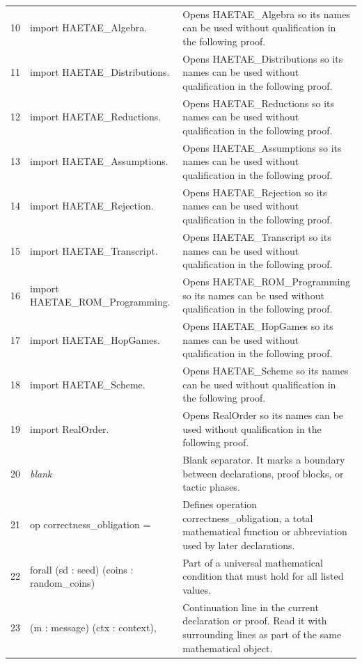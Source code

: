 \documentclass[10pt]{article}
\begin{document}
\begin{longtable}{r L{0.53\textwidth} L{0.37\textwidth}}
10 & {\ttfamily\scriptsize import HAETAE\_Algebra.} & Opens HAETAE\_Algebra so its names can be used without qualification in the following proof. \\
11 & {\ttfamily\scriptsize import HAETAE\_Distributions.} & Opens HAETAE\_Distributions so its names can be used without qualification in the following proof. \\
12 & {\ttfamily\scriptsize import HAETAE\_Reductions.} & Opens HAETAE\_Reductions so its names can be used without qualification in the following proof. \\
13 & {\ttfamily\scriptsize import HAETAE\_Assumptions.} & Opens HAETAE\_Assumptions so its names can be used without qualification in the following proof. \\
14 & {\ttfamily\scriptsize import HAETAE\_Rejection.} & Opens HAETAE\_Rejection so its names can be used without qualification in the following proof. \\
15 & {\ttfamily\scriptsize import HAETAE\_Transcript.} & Opens HAETAE\_Transcript so its names can be used without qualification in the following proof. \\
16 & {\ttfamily\scriptsize import HAETAE\_ROM\_Programming.} & Opens HAETAE\_ROM\_Programming so its names can be used without qualification in the following proof. \\
17 & {\ttfamily\scriptsize import HAETAE\_HopGames.} & Opens HAETAE\_HopGames so its names can be used without qualification in the following proof. \\
18 & {\ttfamily\scriptsize import HAETAE\_Scheme.} & Opens HAETAE\_Scheme so its names can be used without qualification in the following proof. \\
19 & {\ttfamily\scriptsize import RealOrder.} & Opens RealOrder so its names can be used without qualification in the following proof. \\
20 & {\ttfamily\scriptsize \emph{blank}} & Blank separator.  It marks a boundary between declarations, proof blocks, or tactic phases. \\
21 & {\ttfamily\scriptsize op correctness\_obligation =} & Defines operation correctness\_obligation, a total mathematical function or abbreviation used by later declarations. \\
22 & {\ttfamily\scriptsize   forall (sd : seed) (coins : random\_coins)} & Part of a universal mathematical condition that must hold for all listed values. \\
23 & {\ttfamily\scriptsize          (m : message) (ctx : context),} & Continuation line in the current declaration or proof.  Read it with surrounding lines as part of the same mathematical object. \\

\end{longtable}
\end{document}
